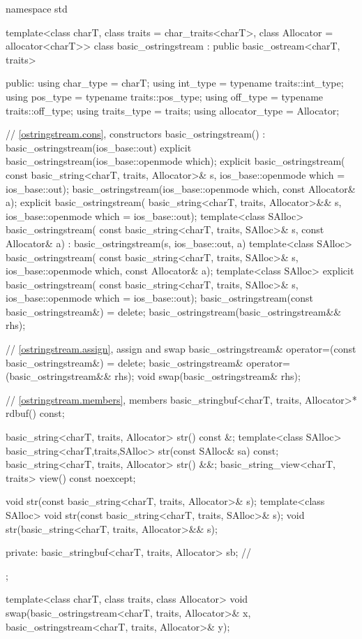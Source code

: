 %
\begin{codeblock}
namespace std {
  template<class charT, class traits = char_traits<charT>,
           class Allocator = allocator<charT>>
  class basic_ostringstream : public basic_ostream<charT, traits> {
  public:
    using char_type      = charT;
    using int_type       = typename traits::int_type;
    using pos_type       = typename traits::pos_type;
    using off_type       = typename traits::off_type;
    using traits_type    = traits;
    using allocator_type = Allocator;

    // \ref{ostringstream.cons}, constructors
    basic_ostringstream() : basic_ostringstream(ios_base::out) {}
    explicit basic_ostringstream(ios_base::openmode which);
    explicit basic_ostringstream(
      const basic_string<charT, traits, Allocator>& s,
      ios_base::openmode which = ios_base::out);
    basic_ostringstream(ios_base::openmode which, const Allocator& a);
    explicit basic_ostringstream(
      basic_string<charT, traits, Allocator>&& s,
      ios_base::openmode which = ios_base::out);
    template<class SAlloc>
      basic_ostringstream(
        const basic_string<charT, traits, SAlloc>& s, const Allocator& a)
        : basic_ostringstream(s, ios_base::out, a) {}
    template<class SAlloc>
      basic_ostringstream(
        const basic_string<charT, traits, SAlloc>& s,
        ios_base::openmode which, const Allocator& a);
    template<class SAlloc>
      explicit basic_ostringstream(
        const basic_string<charT, traits, SAlloc>& s,
        ios_base::openmode which = ios_base::out);
    basic_ostringstream(const basic_ostringstream&) = delete;
    basic_ostringstream(basic_ostringstream&& rhs);

    // \ref{ostringstream.assign}, assign and swap
    basic_ostringstream& operator=(const basic_ostringstream&) = delete;
    basic_ostringstream& operator=(basic_ostringstream&& rhs);
    void swap(basic_ostringstream& rhs);

    // \ref{ostringstream.members}, members
    basic_stringbuf<charT, traits, Allocator>* rdbuf() const;

    basic_string<charT, traits, Allocator> str() const &;
    template<class SAlloc>
      basic_string<charT,traits,SAlloc> str(const SAlloc& sa) const;
    basic_string<charT, traits, Allocator> str() &&;
    basic_string_view<charT, traits> view() const noexcept;

    void str(const basic_string<charT, traits, Allocator>& s);
    template<class SAlloc>
      void str(const basic_string<charT, traits, SAlloc>& s);
    void str(basic_string<charT, traits, Allocator>&& s);

   private:
    basic_stringbuf<charT, traits, Allocator> sb;   // \expos
  };

  template<class charT, class traits, class Allocator>
    void swap(basic_ostringstream<charT, traits, Allocator>& x,
              basic_ostringstream<charT, traits, Allocator>& y);
}
\end{codeblock}

